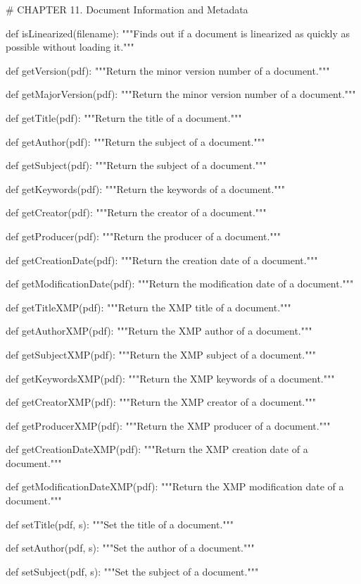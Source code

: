 # CHAPTER 11. Document Information and Metadata

def isLinearized(filename):
    """Finds out if a document is linearized as quickly
    as possible without loading it."""

def getVersion(pdf):
    """Return the minor version number of a document."""

def getMajorVersion(pdf):
    """Return the minor version number of a document."""

def getTitle(pdf):
    """Return the title of a document."""

def getAuthor(pdf):
    """Return the subject of a document."""

def getSubject(pdf):
    """Return the subject of a document."""

def getKeywords(pdf):
    """Return the keywords of a document."""

def getCreator(pdf):
    """Return the creator of a document."""

def getProducer(pdf):
    """Return the producer of a document."""

def getCreationDate(pdf):
    """Return the creation date of a document."""

def getModificationDate(pdf):
    """Return the modification date of a document."""

def getTitleXMP(pdf):
    """Return the XMP title of a document."""

def getAuthorXMP(pdf):
    """Return the XMP author of a document."""

def getSubjectXMP(pdf):
    """Return the XMP subject of a document."""

def getKeywordsXMP(pdf):
    """Return the XMP keywords of a document."""

def getCreatorXMP(pdf):
    """Return the XMP creator of a document."""

def getProducerXMP(pdf):
    """Return the XMP producer of a document."""

def getCreationDateXMP(pdf):
    """Return the XMP creation date of a document."""

def getModificationDateXMP(pdf):
    """Return the XMP modification date of a document."""

def setTitle(pdf, s):
    """Set the title of a document."""

def setAuthor(pdf, s):
    """Set the author of a document."""

def setSubject(pdf, s):
    """Set the subject of a document."""

